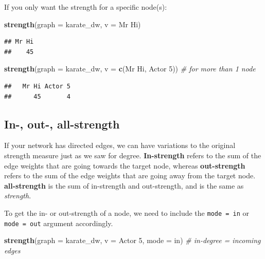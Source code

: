 \documentclass[
]{book}
\newenvironment{Shaded}{\begin{snugshade}}{\end{snugshade}}
\newcommand{\AttributeTok}[1]{\textcolor[rgb]{0.13,0.29,0.53}{#1}}
\newcommand{\CommentTok}[1]{\textcolor[rgb]{0.56,0.35,0.01}{\textit{#1}}}
\newcommand{\FunctionTok}[1]{\textcolor[rgb]{0.13,0.29,0.53}{\textbf{#1}}}
\newcommand{\NormalTok}[1]{#1}
\newcommand{\StringTok}[1]{\textcolor[rgb]{0.31,0.60,0.02}{#1}}
\begin{document}
If you only want the strength for a specific node(s):

\begin{Shaded}
\begin{Highlighting}[]
\FunctionTok{strength}\NormalTok{(}\AttributeTok{graph =}\NormalTok{ karate\_dw, }\AttributeTok{v =} \StringTok{\textquotesingle{}Mr Hi\textquotesingle{}}\NormalTok{)}
\end{Highlighting}
\end{Shaded}

\begin{verbatim}
## Mr Hi 
##    45
\end{verbatim}

\begin{Shaded}
\begin{Highlighting}[]
\FunctionTok{strength}\NormalTok{(}\AttributeTok{graph =}\NormalTok{ karate\_dw, }\AttributeTok{v =} \FunctionTok{c}\NormalTok{(}\StringTok{\textquotesingle{}Mr Hi\textquotesingle{}}\NormalTok{, }\StringTok{\textquotesingle{}Actor 5\textquotesingle{}}\NormalTok{)) }\CommentTok{\# for more than 1 node}
\end{Highlighting}
\end{Shaded}

\begin{verbatim}
##   Mr Hi Actor 5 
##      45       4
\end{verbatim}

\subsection{In-, out-, all-strength}\label{in--out--all-strength}

If your network has directed edges, we can have variations to the original strength measure just as we saw for degree. \textbf{In-strength} refers to the sum of the edge weights that are going towards the target node, whereas \textbf{out-strength} refers to the sum of the edge weights that are going away from the target node. \textbf{all-strength} is the sum of in-strength and out-strength, and is the same as \emph{strength}.

To get the in- or out-strength of a node, we need to include the \texttt{mode\ =\ \textquotesingle{}in\textquotesingle{}} or \texttt{mode\ =\ \textquotesingle{}out\textquotesingle{}} argument accordingly.

\begin{Shaded}
\begin{Highlighting}[]
\FunctionTok{strength}\NormalTok{(}\AttributeTok{graph =}\NormalTok{ karate\_dw, }\AttributeTok{v =} \StringTok{\textquotesingle{}Actor 5\textquotesingle{}}\NormalTok{, }\AttributeTok{mode =} \StringTok{\textquotesingle{}in\textquotesingle{}}\NormalTok{) }\CommentTok{\# in{-}degree = incoming edges}
\end{Highlighting}
\end{Shaded}
\end{document}
